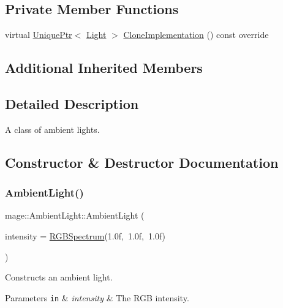 \subsection*{Private Member Functions}
\begin{DoxyCompactItemize}
\item 
virtual \hyperlink{namespacemage_a3316d7143a973e37adf1110f2e80ca31}{Unique\+Ptr}$<$ \hyperlink{classmage_1_1_light}{Light} $>$ \hyperlink{classmage_1_1_ambient_light_a7223a4770653c20e662810b0956c6e51}{Clone\+Implementation} () const override
\end{DoxyCompactItemize}
\subsection*{Additional Inherited Members}


\subsection{Detailed Description}
A class of ambient lights. 

\subsection{Constructor \& Destructor Documentation}
\hypertarget{classmage_1_1_ambient_light_a4ae1590d03ca4e9d854bb6ef650ee126}{}\label{classmage_1_1_ambient_light_a4ae1590d03ca4e9d854bb6ef650ee126} 
\subsubsection{\texorpdfstring{Ambient\+Light()}{AmbientLight()}\hspace{0.1cm}{\footnotesize\ttfamily [1/3]}}
{\footnotesize\ttfamily mage\+::\+Ambient\+Light\+::\+Ambient\+Light (\begin{DoxyParamCaption}\item[{const \hyperlink{structmage_1_1_r_g_b_spectrum}{R\+G\+B\+Spectrum} \&}]{intensity = {\ttfamily \hyperlink{structmage_1_1_r_g_b_spectrum}{R\+G\+B\+Spectrum}(1.0f,~1.0f,~1.0f)} }\end{DoxyParamCaption})\hspace{0.3cm}{\ttfamily [explicit]}}

Constructs an ambient light.


\begin{DoxyParams}[1]{Parameters}
\mbox{\tt in}  & {\em intensity} & The R\+GB intensity. \\
\hline
\end{DoxyParams}
\hypertarget{classmage_1_1_ambient_light_ac5295d1f90e64d3e59ff2856df32a187}{}\label{classmage_1_1_ambient_light_ac5295d1f90e64d3e59ff2856df32a187} 
